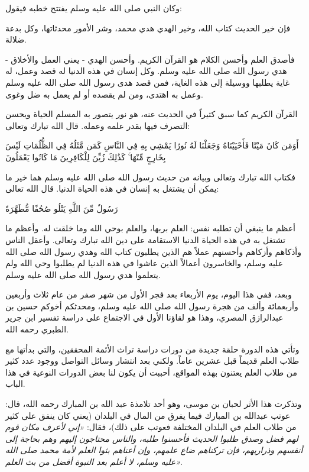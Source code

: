 وكان النبي صلى الله عليه وسلم يفتتح خطبه فيقول:
\begin{hadith}
فإن خير الحديث كتاب الله، وخير الهدي هدي محمد، وشر الأمور محدثاتها، وكل بدعة ضلالة.
\end{hadith}

فأصدق العلم وأحسن الكلام هو القرآن الكريم. وأحسن الهدي - يعني العمل والأخلاق - هدي رسول الله صلى الله عليه وسلم. وكل إنسان في هذه الدنيا له قصد وعمل، له غاية يطلبها ووسيلة إلى هذه الغاية، فمن قصد هدى رسول الله صلى الله عليه وسلم وعمل به اهتدى، ومن لم يقصده أو لم يعمل به ضل وغوى.

القرآن الكريم كما سبق كثيراً في الحديث عنه، هو نور يتصور به المسلم الحياة ويحسن التصرف فيها بقدر علمه وعمله. قال الله تبارك وتعالى:
\begin{ayah}
أَوَمَن كَانَ مَيْتًا فَأَحْيَيْنَاهُ وَجَعَلْنَا لَهُ نُورًا يَمْشِي بِهِ فِي النَّاسِ كَمَن مَّثَلُهُ فِي الظُّلُمَاتِ لَيْسَ بِخَارِجٍ مِّنْهَا ۚ كَذَٰلِكَ زُيِّنَ لِلْكَافِرِينَ مَا كَانُوا يَعْمَلُونَ
\end{ayah}

فكتاب الله تبارك وتعالى وبيانه من حديث رسول الله صلى الله عليه وسلم هما خير ما يمكن أن يشتغل به إنسان في هذه الحياة الدنيا. قال الله تعالى:
\begin{ayah}
رَسُولٌ مِّنَ اللَّهِ يَتْلُو صُحُفًا مُّطَهَّرَةً
\end{ayah}

أعظم ما ينبغي أن تطلبه نفس: العلم بربها، والعلم بوحي الله وما خلقت له. وأعظم ما تشتغل به في هذه الحياة الدنيا الاستقامة على دين الله تبارك وتعالى. وأعقل الناس وأذكاهم وأزكاهم وأحسنهم عملاً هم الذين يطلبون كتاب الله وهدي رسول الله صلى الله عليه وسلم، والخاسرون أعمالاً الذين عاشوا في هذه الدنيا لم يطلبوا وحي الله ولم يتعلموا هدي رسول الله صلى الله عليه وسلم.

وبعد، ففي هذا اليوم، يوم الأربعاء بعد فجر الأول من شهر صفر من عام ثلاث وأربعين وأربعمائة وألف من هجرة رسول الله صلى الله عليه وسلم، ومحدثكم أخوكم حسين بن عبدالرازق المصري، وهذا هو لقاؤنا الأول في الاجتماع على دراسة تفسير ابن جرير الطبري رحمه الله.

وتأتي هذه الدورة حلقة جديدة من دورات دراسة تراث الأئمة المحققين، والتي بدأتها مع طلاب العلم قديماً قبل عشرين عاماً. ولكني بعد انتشار وسائل التواصل ووجود عدد كثير من طلاب العلم يعتنون بهذه المواقع، أحببت أن يكون لنا بعض الدورات النوعية في هذا الباب.

وتذكرت هذا الأثر لحبان بن موسى، وهو أحد تلامذة عبد الله بن المبارك رحمه الله، قال: عوتب عبدالله بن المبارك فيما يفرق من المال في البلدان (يعني كان ينفق على كثير من طلاب العلم في البلدان المختلفة فعوتب على ذلك)، فقال: \textit{«إني لأعرف مكان قوم لهم فضل وصدق طلبوا الحديث فأحسنوا طلبه، والناس محتاجون إليهم وهم بحاجة إلى أنفسهم وذراريهم، فإن تركناهم ضاع علمهم، وإن أعناهم بثوا العلم لأمة محمد صلى الله عليه وسلم، لا أعلم بعد النبوة أفضل من بث العلم»}.

